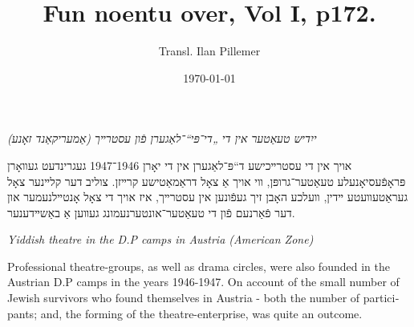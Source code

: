 \documentclass{article}
\begin{document}
\renewcommand{\abstractname}{\vspace{-\baselineskip}}
\title{Fun noentu over, Vol I, p172.}
\author{Transl. Ilan Pillemer}
\date{\today}

\maketitle
{}
\newline

\begin{pairs}

\begin{Rightside}

\begin{RTL}
\begin{hebrew}
\beginnumbering
\autopar
\emph{
ייִדיש טעאַטער אין די „די־פּי“־לאַגערן פֿון עסטרײך (אַמעריקאַנד זאָנע)
}
\newline

אויך אין די עסטרײכישע ד“פּ־לאַגערן אין די יאָרן 1946־1947
געגרינדעט געװאָרן פּראָפֿעסיאָנעלע טעאַטער־גרופּן, װי אויך אַ צאָל דראַמאַטישע קרײזן.
 צוליב דער קלײנער צאָל געראַטעװעטע ײדין, װעלכע האָבן זיך געפֿונען אין עסטרײך, איז אויך די צאָל אָנטײלנעמער און
 דער פֿאַרנעם פֿון די טעאַטער־אונטערנעמונג געװען אַ באַשײדענער.

\endnumbering
\end{hebrew}
\end{RTL}
\end{Rightside}


\begin{Leftside}
\begin{english}
\beginnumbering
\autopar
\emph{
Yiddish theatre in the D.P camps in Austria (American Zone)
}
\newline 
 
Professional theatre-groups, as well as drama circles, were also founded in the Austrian D.P camps in the years 1946-1947.
On account of the small number of Jewish survivors who found themselves in Austria - both the number of participants; and, the forming of
the theatre-enterprise, was quite an outcome.

\endnumbering
\end{english}
\end{Leftside}

\end{pairs}
\Columns
\end{document}

